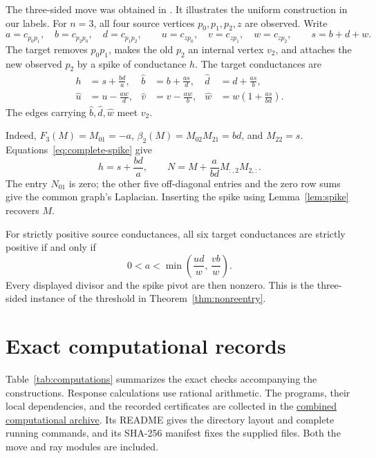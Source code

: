 \documentclass[11pt]{article}
\theoremstyle{definition}
\begin{document}
The three-sided move was obtained in \cite[Appendix A]{ABCC}.
It illustrates the uniform construction in our labels.
For \(n=3\), all four source vertices \(p_0,p_1,p_2,z\) are observed.
Write
\[
 a=c_{p_0p_1},\quad b=c_{p_2p_0},\quad d=c_{p_1p_2},
 \qquad u=c_{zp_0},\quad v=c_{zp_1},\quad w=c_{zp_2},
 \qquad s=b+d+w.
\]
The target removes \(p_0p_1\), makes the old \(p_2\) an internal
vertex \(v_2\), and attaches the new observed \(p_2\) by a spike
of conductance \(h\). The target conductances are
\begin{align*}
 h&=s+\frac{bd}{a},&
 \widehat b&=b+\frac{as}{d},&
 \widehat d&=d+\frac{as}{b},\\
 \widehat u&=u-\frac{aw}{d},&
 \widehat v&=v-\frac{aw}{b},&
 \widehat w&=w\left(1+\frac{as}{bd}\right).
\end{align*}
The edges carrying \(\widehat b,\widehat d,\widehat w\) meet \(v_2\).

Indeed, \(F_3(M)=M_{01}=-a\),
\(\beta_2(M)=M_{02}M_{21}=bd\), and \(M_{22}=s\).
Equations~\eqref{eq:complete-spike} give
\[
 h=s+\frac{bd}{a},\qquad
 N=M+\frac{a}{bd}M_{:,2}M_{2,:}.
\]
The entry \(N_{01}\) is zero; the other five off-diagonal entries
and the zero row sums give the common graph's Laplacian.
Inserting the spike using Lemma~\ref{lem:spike} recovers \(M\).

For strictly positive source conductances, all six target conductances
are strictly positive if and only if
\[
 0<a<\min\left(\frac{ud}{w},\,\frac{vb}{w}\right).
\]
Every displayed divisor and the spike pivot are then nonzero.
This is the three-sided instance of the threshold in
Theorem~\ref{thm:nonreentry}.

\section{Exact computational records}
\label{sec:computations}

Table~\ref{tab:computations} summarizes the exact checks accompanying
the constructions. Response calculations use rational arithmetic.
The programs, their local dependencies, and the recorded certificates
are collected in the
\href{supplementary/punctured_disk_moves_and_rays_supplement.zip}
{combined computational archive}. Its README gives the directory
layout and complete running commands, and its SHA-256 manifest fixes
the supplied files. Both the move and ray modules are included.
\end{document}
